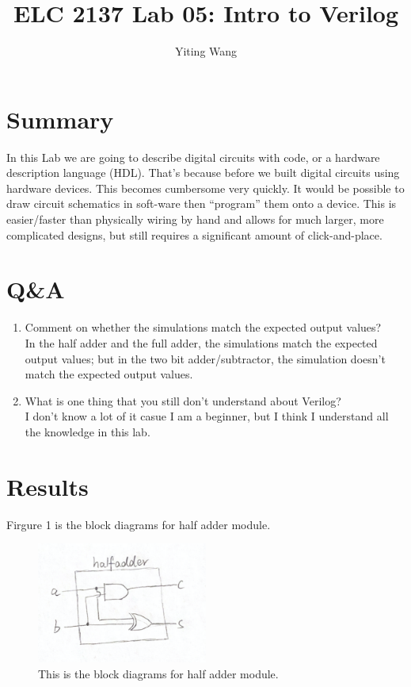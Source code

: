 \documentclass[11pt]{article}
\begin{document}
\title{ELC 2137 Lab 05: Intro to Verilog}
\author{Yiting Wang}

\maketitle


\section*{Summary}

In this Lab we are going to describe digital circuits with code,  or a  hardware description language  (HDL). That's because before we built digital circuits using hardware devices.  This becomes cumbersome very quickly.  It would be possible to draw circuit schematics in soft-ware then “program” them onto a device.  This is easier/faster than physically wiring by hand and allows for much larger, more complicated designs, but still requires a significant amount of click-and-place. 



\section*{Q\&A}

\begin{enumerate}
	\item Comment on whether the simulations match the expected output values? \\
	In the half adder and the full adder, the simulations match the expected output values; but in the two bit adder/subtractor, the simulation doesn't match the expected output values. 
	\item What is one thing that you still don’t understand about Verilog? \\
	I don't know a lot of it casue I am a beginner, but I think I understand all the knowledge in this lab. 
\end{enumerate}



\section*{Results}

Firgure 1 is the block diagrams for half adder module. 
\begin{figure}[ht]\centering    
	\includegraphics[width=0.5\textwidth]{halfadder}    
	\caption{This is the block diagrams for half adder module.}    
	\label{fig:halfadder}
\end{figure}
\end{document}
